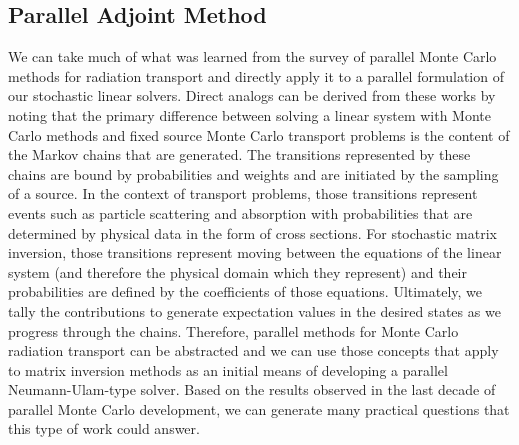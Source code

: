\subsection{Parallel Adjoint Method}
\label{subsec:parallel_adjoint}
We can take much of what was learned from the survey of parallel Monte
Carlo methods for radiation transport and directly apply it to a
parallel formulation of our stochastic linear solvers. Direct analogs
can be derived from these works by noting that the primary difference
between solving a linear system with Monte Carlo methods and fixed
source Monte Carlo transport problems is the content of the Markov
chains that are generated. The transitions represented by these chains
are bound by probabilities and weights and are initiated by the
sampling of a source. In the context of transport problems, those
transitions represent events such as particle scattering and
absorption with probabilities that are determined by physical data in
the form of cross sections. For stochastic matrix inversion, those
transitions represent moving between the equations of the linear
system (and therefore the physical domain which they represent) and
their probabilities are defined by the coefficients of those
equations. Ultimately, we tally the contributions to generate
expectation values in the desired states as we progress through the
chains. Therefore, parallel methods for Monte Carlo radiation
transport can be abstracted and we can use those concepts that apply
to matrix inversion methods as an initial means of developing a
parallel Neumann-Ulam-type solver. Based on the results observed in
the last decade of parallel Monte Carlo development, we can generate
many practical questions that this type of work could answer.

